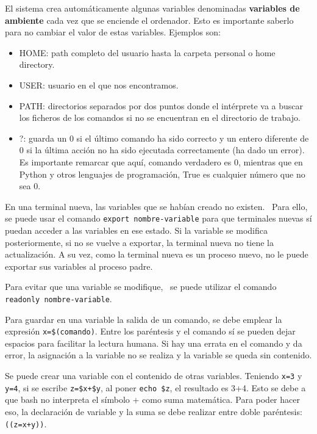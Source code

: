 El sistema crea automáticamente algunas variables denominadas \textbf{variables de ambiente} cada vez que se enciende el ordenador. Esto es importante saberlo para no cambiar el valor de estas variables. Ejemplos son: \begin{itemize}
\item HOME: path completo del usuario hasta la carpeta personal o home directory.
\item USER: usuario en el que nos encontramos.
\item PATH: directorios separados por dos puntos donde el intérprete va a buscar los ficheros de los comandos si no se encuentran en el directorio de trabajo.
\item ?: guarda un 0 si el último comando ha sido correcto y un entero diferente de 0 si la última acción no ha sido ejecutada correctamente (ha dado un error). Es importante remarcar que aquí, comando verdadero es 0, mientras que en Python y otros lenguajes de programación, True es cualquier número que no sea 0.
\end{itemize}

En una terminal nueva, las variables que se habían creado no existen.  \ Para ello, se puede usar el comando \texttt{export nombre-variable} para que terminales nuevas sí puedan acceder a las variables en ese estado. Si la variable se modifica posteriormente, si no se vuelve a exportar, la terminal nueva no tiene la actualización. A su vez, como la terminal nueva es un proceso nuevo, no le puede exportar sus variables al proceso padre.

Para evitar que una variable se modifique,  \ se puede utilizar el comando \texttt{readonly nombre-variable}. 

Para guardar en una variable la salida de un comando, se debe emplear la expresión \texttt{x=\$(comando)}. Entre los paréntesis y el comando sí se pueden dejar espacios para facilitar la lectura humana. Si hay una errata en el comando y da error, la asignación a la variable no se realiza y la variable se queda sin contenido. 

Se puede crear una variable con el contenido de otras variables. Teniendo \texttt{x=3} y \texttt{y=4}, si se escribe \texttt{z=\$x+\$y}, al poner \texttt{echo \$z}, el resultado es 3+4. Esto se debe a que bash no interpreta el símbolo + como suma matemática. Para poder hacer eso, la declaración de variable y la suma se debe realizar entre doble paréntesis: \texttt{((z=x+y))}.

